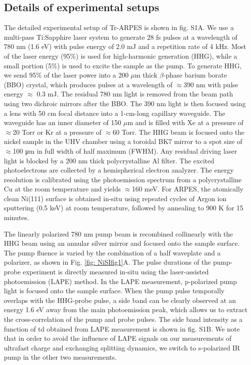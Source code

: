 \subsection{Details of experimental setups}
The detailed experimental setup of Tr-ARPES is shown in fig. S1A. We use a multi-pass Ti:Sapphire laser system to generate 28 fs pulses at a wavelength of 780 nm (1.6 eV) with pulse energy of 2.0 mJ and a repetition rate of 4 kHz. Most of the laser energy (95\%) is used for high-harmonic generation (HHG), while a small portion (5\%) is used to excite the sample as the pump. To generate HHG, we send 95\% of the laser power into a 200 $\mu$m thick $\beta$-phase barium borate (BBO) crystal, which produces pulses at a wavelength of $\approx$390 nm with pulse energy $\approx$ 0.3 mJ. The residual 780 nm light is removed from the beam path using two dichroic mirrors after the BBO. The 390 nm light is then focused using a lens with 50 cm focal distance into a 1-cm-long capillary waveguide. The waveguide has an inner diameter of 150 $\mu$m and is filled with Xe at a pressure of $\approx$20 Torr or Kr at a pressure of $\approx$60 Torr. The HHG beam is focused onto the nickel sample in the UHV chamber using a toroidal BK7 mirror to a spot size of $\approx$100 μm in full width of half maximum (FWHM). Any residual driving laser light is blocked by a 200 nm thick polycrystalline Al filter. The excited photoelectrons are collected by a hemispherical electron analyzer. The energy resolution is calibrated using the photoemission spectrum from a polycrystalline Cu at the room temperature and yields $\approx$160 meV. For ARPES, the atomically clean Ni(111) surface is obtained in-situ using repeated cycles of Argon ion sputtering (0.5 keV) at room temperature, followed by annealing to 900 K for 15 minutes.

The linearly polarized 780 nm pump beam is recombined collinearly with the HHG beam using an annular silver mirror and focused onto the sample surface. The pump fluence is varied by the combination of a half waveplate and a polarizer, as shown in Fig. \ref{fig: NiSIfig1}A. The pulse durations of the pump-probe experiment is directly measured in-situ using the laser-assisted photoemission (LAPE) method. In the LAPE measurement, p-polarized pump light is focused onto the sample surface. When the pump pulse temporally overlaps with the HHG-probe pulse, a side band can be clearly observed at an energy 1.6 eV away from the main photoemission peak, which allows us to extract the cross-correlation of the pump and probe pulses. The side band intensity as a function of td obtained from LAPE measurement is shown in fig. S1B. We note that in order to avoid the influence of LAPE signals on our measurements of ultrafast charge and exchanging splitting dynamics, we switch to s-polarized IR pump in the other two measurements.

